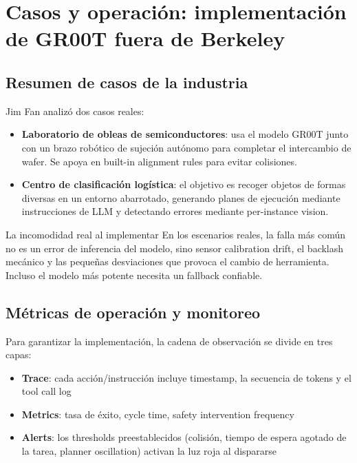 \section{Casos y operación: implementación de GR00T fuera de Berkeley}

\subsection{Resumen de casos de la industria}

Jim Fan analizó dos casos reales:

\begin{itemize}
    \item \textbf{Laboratorio de obleas de semiconductores}: usa el modelo GR00T junto con un brazo robótico de sujeción autónomo para completar el intercambio de wafer. Se apoya en built-in alignment rules para evitar colisiones.
    \item \textbf{Centro de clasificación logística}: el objetivo es recoger objetos de formas diversas en un entorno abarrotado, generando planes de ejecución mediante instrucciones de LLM y detectando errores mediante per-instance vision.
\end{itemize}

\begin{warningbox}{La incomodidad real al implementar}
En los escenarios reales, la falla más común no es un error de inferencia del modelo, sino sensor calibration drift, el backlash mecánico y las pequeñas desviaciones que provoca el cambio de herramienta. Incluso el modelo más potente necesita un fallback confiable.
\end{warningbox}

\subsection{Métricas de operación y monitoreo}

Para garantizar la implementación, la cadena de observación se divide en tres capas:

\begin{itemize}
    \item \textbf{Trace}: cada acción/instrucción incluye timestamp, la secuencia de tokens y el tool call log
    \item \textbf{Metrics}: tasa de éxito, cycle time, safety intervention frequency
    \item \textbf{Alerts}: los thresholds preestablecidos (colisión, tiempo de espera agotado de la tarea, planner oscillation) activan la luz roja al dispararse
\end{itemize}

